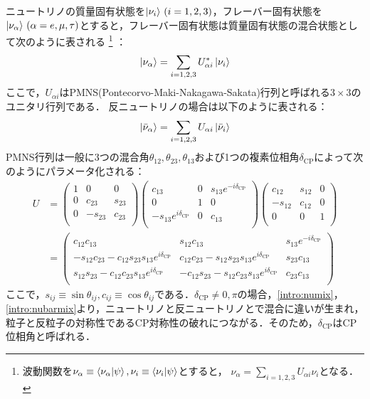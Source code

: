 \documentclass[../../main.tex]{subfiles}
\begin{document}
ニュートリノの質量固有状態を$\ket{\nu_{i}}\,(i=1,2,3)$，フレーバー固有状態を$\ket{\nu_{\alpha}}\,(\alpha=e,\mu,\tau)$とすると，フレーバー固有状態は質量固有状態の混合状態として次のように表される
\footnote{波動関数を$\nu_{\alpha}\equiv\bra{\nu_{\alpha}}\ket{\psi},\nu_{i}\equiv\bra{\nu_{i}}\ket{\psi}$とすると，
$\nu_{\alpha}=\sum_{i=1,2,3}U_{\alpha i}\nu_{i}$となる．}
：
\begin{gather}
  \label{intro:numix}
  \ket{\nu_{\alpha}}=\sum_{i=1,2,3}U^{*}_{\alpha i}\ket{\nu_{i}}
\end{gather}
ここで，$U_{\alpha i}$はPMNS(Pontecorvo-Maki-Nakagawa-Sakata)行列と呼ばれる$3\times3$のユニタリ行列である．
反ニュートリノの場合は以下のように表される：
\begin{gather}
  \label{intro:nubarmix}
  \ket{\bar{\nu}_{\alpha}}=\sum_{i=1,2,3}U_{\alpha i}\ket{\bar{\nu}_{i}}
\end{gather}
PMNS行列は一般に3つの混合角$\theta_{12},\theta_{23},\theta_{13}$および1つの複素位相角$\delta_{\mathrm{CP}}$によって次のようにパラメータ化される：
\begin{align}
  U &=
  \begin{pmatrix}
    1&0&0\\
    0&c_{23}&s_{23}\\
    0&-s_{23}&c_{23}\\
  \end{pmatrix}
  \begin{pmatrix}
  c_{13}&0&s_{13}e^{-i\delta_{\mathrm{CP}}}\\
  0&1&0\\
  -s_{13}e^{i\delta_{\mathrm{CP}}}&0&c_{13}\\
\end{pmatrix}
\begin{pmatrix}
  c_{12}&s_{12}&0\\
  -s_{12}&c_{12}&0\\
  0&0&1\\
\end{pmatrix}\nonumber\\
&=
\begin{pmatrix}
  c_{12}c_{13}&s_{12}c_{13}&s_{13}e^{-i\delta_{\mathrm{CP}}}\\
  -s_{12}c_{23} − c_{12}s_{23}s_{13}e^{i\delta_{\mathrm{CP}}}&c_{12}c_{23} - s_{12}s_{23}s_{13}e^{i\delta_{\mathrm{CP}}}&s_{23}c_{13}\\
  s_{12}s_{23} - c_{12}c_{23}s_{13}e^{i\delta_{\mathrm{CP}}}&-c_{12}s_{23} - s_{12}c_{23}s_{13}e^{i\delta_{\mathrm{CP}}}&c_{23}c_{13}\\
\end{pmatrix}
\label{eq:pmns}
\end{align}
ここで，$s_{ij}\equiv\sin{\theta_{ij}},c_{ij}\equiv\cos{\theta_{ij}}$である．$\delta_{\mathrm{CP}}\neq0,\pi$の場合，\eqref{intro:numix}，\eqref{intro:nubarmix}より，ニュートリノと反ニュートリノとで混合に違いが生まれ，粒子と反粒子の対称性であるCP対称性の破れにつながる．そのため，$\delta_{\mathrm{CP}}$はCP位相角と呼ばれる．
\end{document}
